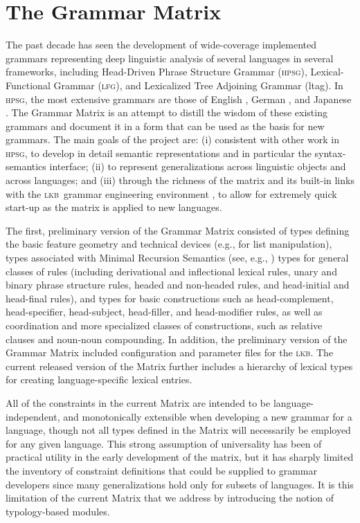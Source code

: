 \documentclass[11pt]{article}
\newcommand{\hpsg}{\textsc{hpsg}}
\newcommand{\lkb}{\textsc{lkb}}
\newcommand{\lfg}{\textsc{lfg}}
\begin{document}
\section{The Grammar Matrix}

The past decade has seen the development of wide-coverage implemented
grammars representing deep linguistic analysis of several languages in
several frameworks, including Head-Driven Phrase Structure Grammar
(\hpsg), Lexical-Functional Grammar (\lfg), and Lexicalized Tree
Adjoining Grammar ({\sc ltag}). In \hpsg, the most extensive grammars
are those of English \cite{Flickinger:00}, German \cite{Mue:Kap:00},
and Japanese \cite{Siegel:00,Siegel:Bender:02}.  The Grammar Matrix
\cite{Ben:Fli:Oe:02} is an attempt to distill the wisdom of these
existing grammars and document it in a form that can be used as the
basis for new grammars. The main goals of the project are: (i)
consistent with other work in \hpsg, to develop in detail semantic
representations and in particular the syntax-semantics interface; (ii)
to represent generalizations across linguistic objects and across
languages; and (iii) through the richness of the matrix and its
built-in links with the \lkb\ grammar engineering environment
\cite{Copestake:02}, to allow for extremely quick start-up as the
matrix is applied to new languages.

The first, preliminary version of the Grammar Matrix 
consisted of types defining the basic feature geometry and technical
devices (e.g., for list manipulation), types associated with Minimal
Recursion Semantics (see, e.g., \cite{Cop:Las:Fli:01}) types for
general classes of rules (including derivational and inflectional
lexical rules, unary and binary phrase structure rules, headed and
non-headed rules, and head-initial and head-final rules), and types
for basic constructions such as head-complement, head-specifier,
head-subject, head-filler, and head-modifier rules, as well as 
coordination and more specialized classes of constructions, such as relative
clauses and noun-noun compounding.  In addition, the preliminary
version of the Grammar Matrix included configuration and parameter
files for the \lkb.  The current released version of the Matrix further 
includes a hierarchy of lexical types for creating language-specific 
lexical entries.

All of the constraints in the current Matrix are intended to be 
language-independent, and monotonically extensible when developing a
new grammar for a language, though not all types defined in the Matrix
will necessarily be employed for any given language.  This strong 
assumption of universality has been of practical utility in the early
development of the matrix, but it has sharply limited the inventory of
constraint definitions that could be supplied to grammar developers
since many generalizations hold only for subsets of languages.  It is
this limitation of the current Matrix that we address by introducing
the notion of typology-based modules.
\end{document}
